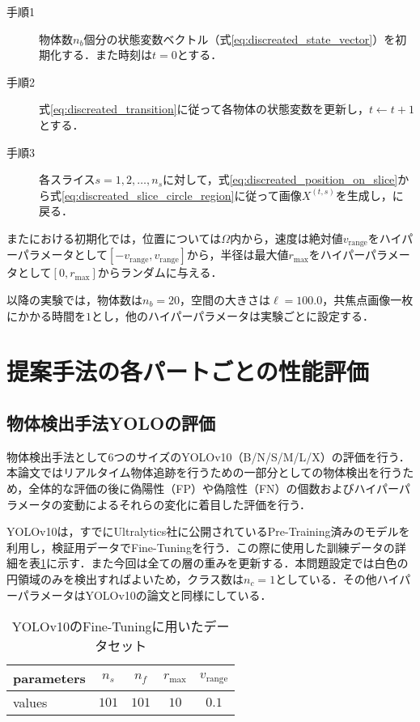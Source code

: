     \begin{description}
        \item[手順1] 物体数$n_b$個分の状態変数ベクトル（式\ref{eq:discreated_state_vector}）を初期化する．また時刻は$t=0$とする．
        \item[手順2] 式\ref{eq:discreated_transition}に従って各物体の状態変数を更新し，$t \gets t + 1$とする．
        \item[手順3] 各スライス$s=1,2,\dots,n_s$に対して，式\ref{eq:discreated_position_on_slice}から式\ref{eq:discreated_slice_circle_region}に従って画像$X^{(t,s)}$を生成し，に戻る．
    \end{description}

    またにおける初期化では，位置については$\Omega$内から，速度は絶対値$v_{\text{range}}$をハイパーパラメータとして$[-v_{\text{range}}, v_{\text{range}}]$から，半径は最大値$r_{\text{max}}$をハイパーパラメータとして$[0, r_{\text{max}}]$からランダムに与える．

    以降の実験では，物体数は$n_b = 20$，空間の大きさは$\ell = 100.0$，共焦点画像一枚にかかる時間を$1$とし，他のハイパーパラメータは実験ごとに設定する．

\section{提案手法の各パートごとの性能評価}

    \subsection{物体検出手法YOLOの評価}

    物体検出手法として6つのサイズのYOLOv10（B/N/S/M/L/X）の評価を行う．本論文ではリアルタイム物体追跡を行うための一部分としての物体検出を行うため，全体的な評価の後に偽陽性（FP）や偽陰性（FN）の個数およびハイパーパラメータの変動によるそれらの変化に着目した評価を行う．

    YOLOv10は，すでにUltralytics社に公開されているPre-Training済みのモデルを利用し，検証用データでFine-Tuningを行う．この際に使用した訓練データの詳細を表\ref{tab:fine_tuning}に示す．また今回は全ての層の重みを更新する．本問題設定では白色の円領域のみを検出すればよいため，クラス数は$n_c = 1$としている．その他ハイパーパラメータはYOLOv10の論文\cite{wang2024yolov10}と同様にしている．

    \begin{table}[t]
        \centering
        \caption[YOLOv10のFine-Tuningに用いたデータセット]{YOLOv10のFine-Tuningに用いたデータセット}
        \label{tab:fine_tuning}
        \begin{tabular}{|l||cccc|}
            \hline parameters & $n_s$ & $n_f$ & $r_{\text{max}}$ & $v_{\text{range}}$ 
            \\ \hline values & $101$ & $101$ & $10$ & $0.1$ \\\hline
        \end{tabular}
    \end{table}

